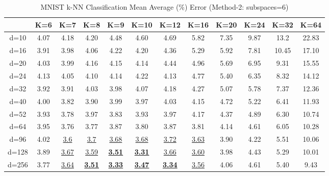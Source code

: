 \begin{table}[H]
\centering
\label{tab:table1}
\begin{tabular}{|c|c|c|c|c|c|c|c|c|c|c|c|}
\hline
& K=6 & K=7 & K=8 & K=9 & K=10 & K=12 & K=16 & K=20 & K=24 & K=32 & K=64 \\
\hline
d=10 & 4.07 & 4.18 & 4.20 & 4.48 & 4.60 & 4.69 & 5.82 & 7.35 & 9.87 & 13.2 & 22.83 \\
d=16 & 3.91 & 3.98 & 4.06 & 4.22 & 4.20 & 4.36 & 5.29 & 5.92 & 7.81 & 10.45 & 17.10 \\
d=20 & 4.03 & 3.99 & 4.16 & 4.15 & 4.14 & 4.44 & 4.96 & 5.69 & 6.95 & 9.31 & 15.55 \\
d=24 & 4.13 & 4.05 & 4.10 & 4.14 & 4.22 & 4.13 & 4.77 & 5.40 & 6.35 & 8.32 & 14.12 \\
d=32 & 3.92 & 3.91 & 4.03 & 3.98 & 4.07 & 4.18 & 4.27 & 5.07 & 5.78 & 7.37 & 12.36 \\
d=40 & 4.00 & 3.82 & 3.90 & 3.99 & 3.97 & 4.03 & 4.15 & 4.72 & 5.22 & 6.41 & 11.93 \\
d=52 & 3.93 & 3.78 & 3.97 & 3.83 & 3.93 & 3.97 & 4.17 & 4.37 & 4.89 & 6.30 & 10.74 \\
d=64 & 3.95 & 3.76 & 3.77 & 3.87 & 3.80 & 3.87 & 3.81 & 4.14 & 4.61 & 6.05 & 10.28 \\
d=96 & 4.02 & \underline{3.6} & \underline{3.7} & \underline{3.68} & \underline{3.68} & \underline{3.72} & \underline{3.63} & 3.90 & 4.22 & 5.51 & 10.06 \\
d=128 & 3.89 & \underline{3.67} & \underline{3.59} & \textbf{\underline{3.51}} & \textbf{\underline{3.31}} & \underline{3.66} & \underline{3.60} & 3.98 & 4.43 & 5.29 & 10.01 \\
d=256 & 3.77 & \underline{3.64} & \textbf{\underline{3.51}} & \textbf{\underline{3.33}} & \textbf{\underline{3.47}} & \textbf{\underline{3.34}} & \underline{3.56} & 4.06 & 4.61 & 5.40 & 9.43 \\
\hline
\end{tabular}
\caption{MNIST k-NN Classification Mean Average (\%) Error (Method-2: subspaces=6)}
\end{table}

